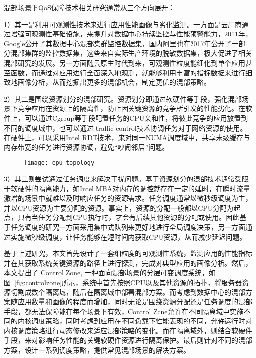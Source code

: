 混部场景下QoS保障技术相关研究通常从三个方向展开：

1）其一是利用可观测性技术来进行应用性能画像与劣化监测。一方面是云厂商通过增强可观测性基础设施，来提升对数据中心持续监控与性能预警能力，2011年，Google公开了其数据中心混部集群监控数据集，国内阿里也在2017年公开了一部分混部集群的监控数据集\citep{guo2019limits}，这些来自实际生产环境的脱敏数据集，极大促进了相关混部研究的发展。另一方面随云原生时代到来，可观测性粒度能细化到单个应用甚至函数，而通过对应用进行全面深入地观测，就能够利用丰富的指标数据来进行细致地画像分析，从而挖掘出更多的混部机会，制定更优的混部策略。

2）其二是围绕资源划分的混部研究。资源划分即通过软硬件等手段，强化混部场景下竞争应用在资源上的隔离性，防止因关键资源的竞争所引发的性能劣化。在软件上，可以通过Cgroup等手段配置任务的CPU亲和性，将彼此竞争的应用放置到不同的调度域中，也可以通过 traffic control技术\citep{hubert2002linux}协调任务对于网络资源的使用。在硬件上，可以采用Intel RDT技术\citep{guide2011intel}，来对同一NUMA调度域中，共享末级缓存与内存带宽的任务进行资源协调，避免“吵闹邻居”问题\citep{xu2018dcat, maricq2018taming, rzadca2020autopilot, kwon2020dc}。

\begin{figure}[!htbp]
    \centering
    \texttt{[image: cpu\_topology]}
    \label{fig:cpu_topology}
\end{figure}

3）其三则尝试通过任务调度来解决干扰问题。基于资源划分的混部技术通常受限于软硬件的隔离能力，如Intel MBA对内存的调控就存在一定的延时\citep{herdrich2016cache}，在瞬时流量激增的场景中就难以及时响应任务的资源需求。任务调度通常以微秒级调度为主，并以CPU资源为主要分配的资源。事实上，资源的分配一般都以CPU分配为起点，只有当任务分配到CPU执行时，才会有后续其他资源的分配或使用。因此基于任务调度的研究一方面采用集中式队列来更好地进行全局调度决策，另一方面通过实施微秒级调度，让任务能够在短时间内获取CPU资源，从而减少延迟问题。

基于上述研究，本文首先设计了一套细粒度的可观测性系统，监测应用的性能指标并在其获取系统关键资源的路径上进行探测，完成对典型应用的画像分析。然后，本文提出了 Control Zone, 一种面向混部场景的分层可变调度系统，如图~\ref{fig:controlzone}所示，系统中首先按照CPU以及其他资源的拓扑，将服务器资源切割成数个隔离域，随后在隔离域中部署混部方案。而考虑到数据中心的混部方案随应用数量和画像的程度而增加，同时无论是围绕资源分配还是任务调度的混部手段，都无法保障能在每个场景下有效，Control Zone允许在不同隔离域中实施不同的内核调度策略，同时考虑到应用在不同负载下性能表现的不同，允许运行时对内核调度策略进行动态修改来适应混部策略的变化。而在隔离域外，则结合软硬件手段，来对影响任务性能的关键软硬件资源进行隔离保护。最后则针对不同的混部方案，设计一系列调度策略，提供常见混部场景的解决方案。

